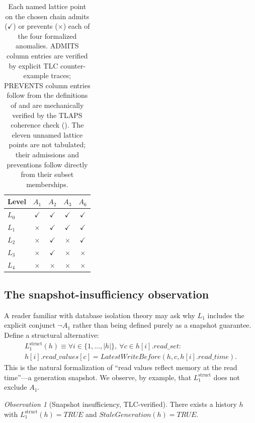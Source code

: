 \documentclass[journal,compsoc,10pt]{IEEEtran}
\theoremstyle{definition}
\theoremstyle{remark}
\newtheorem*{observation}{Observation}
\newcommand{\fld}[1]{\mathit{#1}}
\newcommand{\rs}{\fld{read\_set}}
\newcommand{\rt}{\fld{read\_time}}
\newcommand{\rv}{\fld{read\_values}}
\begin{document}
\begin{table}[h]
\centering
\caption{Each named lattice point on the chosen chain admits
($\checkmark$) or prevents ($\times$) each of the four formalized
anomalies. ADMITS column entries are verified by explicit TLC
counter-example traces; PREVENTS column entries follow from the
definitions of  and are mechanically verified
by the TLAPS coherence check (). The eleven
unnamed lattice points are not tabulated; their admissions and
preventions follow directly from their subset memberships.}
\label{tab:chain}
\begin{tabular}{lcccc}
\hline
Level & $A_1$ & $A_2$ & $A_3$ & $A_6$ \\
\hline
$L_0$ & $\checkmark$ & $\checkmark$ & $\checkmark$ & $\checkmark$ \\
$L_1$ & $\times$     & $\checkmark$ & $\checkmark$ & $\checkmark$ \\
$L_2$ & $\times$     & $\checkmark$ & $\times$     & $\checkmark$ \\
$L_3$ & $\times$     & $\checkmark$ & $\times$     & $\times$     \\
$L_4$ & $\times$     & $\times$     & $\times$     & $\times$     \\
\hline
\end{tabular}
\end{table}

\subsection{The snapshot-insufficiency observation}
\label{sec:snapshot-insufficiency}
A reader familiar with database isolation theory may ask why $L_1$
includes the explicit conjunct $\neg A_1$ rather than being defined
purely as a snapshot guarantee. Define a structural alternative:
\[
  \begin{gathered}
  L_1^{\text{struct}}(h) \equiv
  \forall i \in \{1,\ldots,|h|\},\ \forall c \in h[i].\rs :\\
  h[i].\rv[c] = \fld{LatestWriteBefore}(h, c, h[i].\rt).
  \end{gathered}
\]
This is the natural formalization of ``read values reflect memory at
the read time''---a generation snapshot. We observe, by example, that
$L_1^{\text{struct}}$ does not exclude $A_1$.

\begin{observation}[Snapshot insufficiency, TLC-verified]
\label{obs:snapshot}
There exists a history $h$ with $L_1^{\text{struct}}(h) = \mathit{TRUE}$
and $\fld{StaleGeneration}(h) = \mathit{TRUE}$.
\end{observation}
\end{document}
